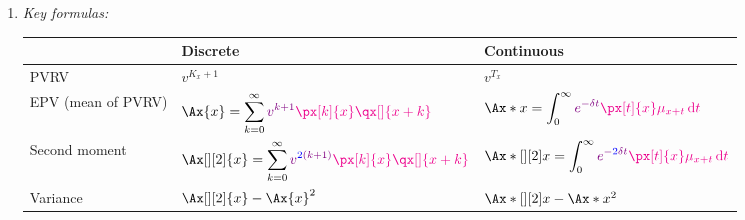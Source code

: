 \begin{enumerate}
\begin{enumerate}[label={(\arabic*)}]
For all kinds of insurance coverages in , they
can be broadly classified into two types: (i) discrete and (ii) continuous:
\begin{itemize}
\item \emph{Discrete:} The benefit payment is paid \emph{at the end of the year} of death.
\item \emph{Continuous:} The benefit payment is paid \emph{at the moment} of death.
\end{itemize}
More specifically, if we start counting time at the age \(x\) of the life
insured:
\begin{itemize}
\item The end of the year of death is at time \(K_x+1\).
\item The moment of death is at time \(T_x\).
\end{itemize}
\begin{center}
\end{center}
\item \emph{Key formulas:}
\begin{center}
\begin{tabular}{lll}
\toprule
&Discrete&Continuous \\
\midrule
PVRV&\(v^{K_x+1}\)&\(v^{T_x}\) \\
EPV (mean of PVRV)&\(\displaystyle \Ax{x}=\sum_{k=0}^{\infty}\vc{v^{k+1}}\mgc{\px[k]{x}\qx[]{x+k}}\)&
\(\displaystyle \Ax*{x}=\int_{0}^{\infty}\vc{e^{-\delta t}}\mgc{\px[t]{x}\mu_{x+t}\dd{t}}\)
\\
Second moment&\(\displaystyle \Ax[][2]{x}=\sum_{k=0}^{\infty}\vc{v^{\blc{2}(k+1)}}\mgc{\px[k]{x}\qx[]{x+k}}\)&\(
\displaystyle \Ax*[][2]{x}=\int_{0}^{\infty}\vc{e^{-\blc{2}\delta t}}\mgc{\px[t]{x}\mu_{x+t}\dd{t}}
\) \\
Variance&\(\Ax[][2]{x}-\Ax{x}^{2}\)&\(\Ax*[][2]{x}-\Ax*{x}^{2}\) \\

\end{tabular}
\end{center}
\end{enumerate}
\end{enumerate}
